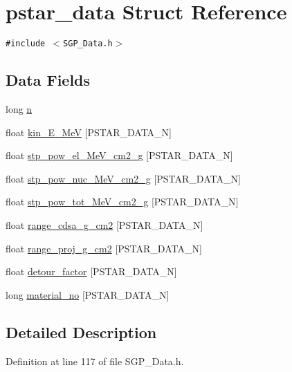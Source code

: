 \hypertarget{structpstar__data}{
\section{pstar\_\-data Struct Reference}
\label{df/d58/structpstar__data}
}
{\tt \#include $<$SGP\_\-Data.h$>$}

\subsection*{Data Fields}
\begin{CompactItemize}
\item 
long \hyperlink{structpstar__data_b673e7b9aced6ac41c2f526699051ba8}{n}
\item 
float \hyperlink{structpstar__data_ed3ea605781911d8bbcd22d3eab16e35}{kin\_\-E\_\-MeV} \mbox{[}PSTAR\_\-DATA\_\-N\mbox{]}
\item 
float \hyperlink{structpstar__data_ca618cfe3331d8496644230660585274}{stp\_\-pow\_\-el\_\-MeV\_\-cm2\_\-g} \mbox{[}PSTAR\_\-DATA\_\-N\mbox{]}
\item 
float \hyperlink{structpstar__data_30e9e431834a83e1a5c061f431cbf5ac}{stp\_\-pow\_\-nuc\_\-MeV\_\-cm2\_\-g} \mbox{[}PSTAR\_\-DATA\_\-N\mbox{]}
\item 
float \hyperlink{structpstar__data_8875c1eb48825aebf860e42e8d9113f7}{stp\_\-pow\_\-tot\_\-MeV\_\-cm2\_\-g} \mbox{[}PSTAR\_\-DATA\_\-N\mbox{]}
\item 
float \hyperlink{structpstar__data_1a97d8bf7fb77c6a1ddeac3792fdaeb3}{range\_\-cdsa\_\-g\_\-cm2} \mbox{[}PSTAR\_\-DATA\_\-N\mbox{]}
\item 
float \hyperlink{structpstar__data_1591a6c0b3797ad8481bccb22e2a741a}{range\_\-proj\_\-g\_\-cm2} \mbox{[}PSTAR\_\-DATA\_\-N\mbox{]}
\item 
float \hyperlink{structpstar__data_0ec83a1b0c2d1f5e24a8af5454f4e339}{detour\_\-factor} \mbox{[}PSTAR\_\-DATA\_\-N\mbox{]}
\item 
long \hyperlink{structpstar__data_9912dd060cf2dc98a13afebee1efda35}{material\_\-no} \mbox{[}PSTAR\_\-DATA\_\-N\mbox{]}
\end{CompactItemize}


\subsection{Detailed Description}


Definition at line 117 of file SGP\_\-Data.h.

